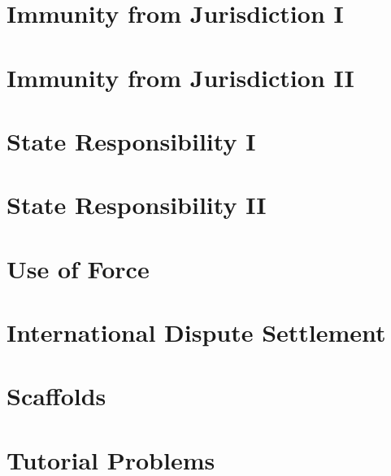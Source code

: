 \documentclass[oneside, 12pt]{book}
\begin{document}
\chapter{Immunity from Jurisdiction I}


\chapter{Immunity from Jurisdiction II}


\chapter{State Responsibility I}


\chapter{State Responsibility II}


\chapter{Use of Force}


\chapter{International Dispute Settlement}


\appendix
\chapter{Scaffolds}


\chapter{Tutorial Problems}


\glsaddall
\printglossary[type=main, nonumberlist, title={Glossary}]
\end{document}
